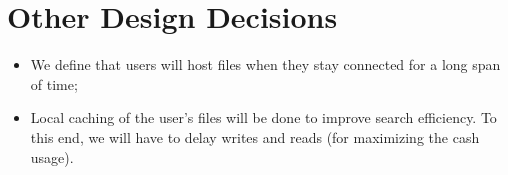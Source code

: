 \documentclass[times,9pt,article]{llncs}
\begin{document}
\section{Other Design Decisions}
\begin{itemize}
\item We define that users will host files when they stay connected for a long span of time;
\item Local caching of the user's files will be done to improve search efficiency.
To this end, we will have to delay writes and reads (for maximizing the cash usage).
\end{itemize}
\end{document}
